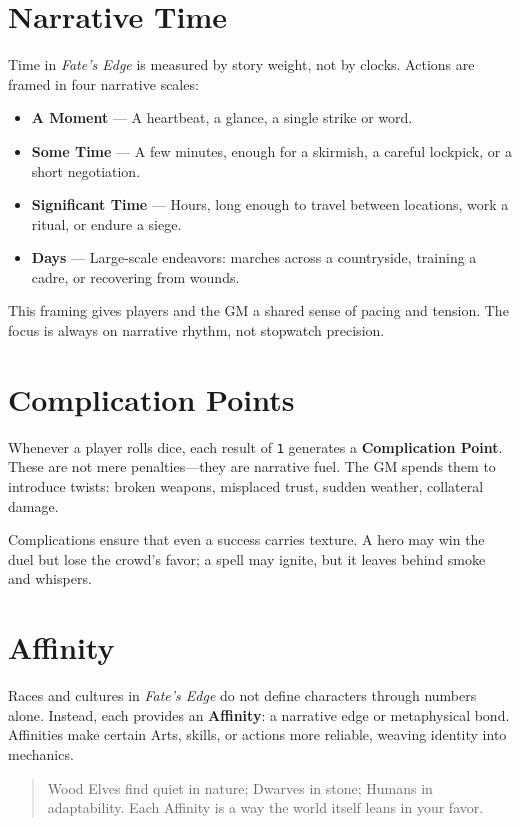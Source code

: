 \documentclass[12pt]{article}
\begin{document}
\section{Narrative Time}
Time in \textit{Fate’s Edge} is measured by story weight, not by clocks. Actions are framed in four narrative scales:
\begin{itemize}
  \item \textbf{A Moment} — A heartbeat, a glance, a single strike or word.
  \item \textbf{Some Time} — A few minutes, enough for a skirmish, a careful lockpick, or a short negotiation.
  \item \textbf{Significant Time} — Hours, long enough to travel between locations, work a ritual, or endure a siege.
  \item \textbf{Days} — Large-scale endeavors: marches across a countryside, training a cadre, or recovering from wounds.
\end{itemize}
This framing gives players and the GM a shared sense of pacing and tension. The focus is always on narrative rhythm, not stopwatch precision.  

\section{Complication Points}
Whenever a player rolls dice, each result of \texttt{1} generates a \textbf{Complication Point}. These are not mere penalties—they are narrative fuel. The GM spends them to introduce twists: broken weapons, misplaced trust, sudden weather, collateral damage.  

Complications ensure that even a success carries texture. A hero may win the duel but lose the crowd’s favor; a spell may ignite, but it leaves behind smoke and whispers.  

\section{Affinity}
Races and cultures in \textit{Fate’s Edge} do not define characters through numbers alone. Instead, each provides an \textbf{Affinity}: a narrative edge or metaphysical bond. Affinities make certain Arts, skills, or actions more reliable, weaving identity into mechanics.  
\begin{quote}
Wood Elves find quiet in nature; Dwarves in stone; Humans in adaptability. Each Affinity is a way the world itself leans in your favor.
\end{quote}
\end{document}

